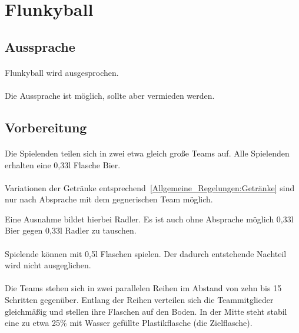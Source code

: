 \section{Flunkyball}
\subsection{Aussprache}
\paragraph{}
Flunkyball wird  ausgesprochen.

\paragraph{}
Die Aussprache  ist möglich, sollte aber vermieden werden.

\subsection{Vorbereitung}
\paragraph{}
Die Spielenden teilen sich in zwei etwa gleich große Teams auf.
Alle Spielenden erhalten eine 0,33l Flasche Bier.

\paragraph{}Variationen der Getränke entsprechend~\ref{Allgemeine_Regelungen:Getränke} sind nur nach Absprache mit dem gegnerischen Team möglich.

Eine Ausnahme bildet hierbei Radler.
Es ist auch ohne Absprache möglich 0,33l Bier gegen 0,33l Radler zu tauschen.

\paragraph{}
Spielende können mit 0,5l Flaschen spielen. Der dadurch entstehende Nachteil wird nicht ausgeglichen.

\paragraph{}
Die Teams stehen sich in zwei parallelen Reihen im Abstand von zehn bis 15 Schritten gegenüber.
Entlang der Reihen verteilen sich die Teammitglieder gleichmäßig und stellen ihre Flaschen auf den Boden.
In der Mitte steht stabil eine zu etwa 25\% mit Wasser gefüllte Plastikflasche (die Zielflasche).

